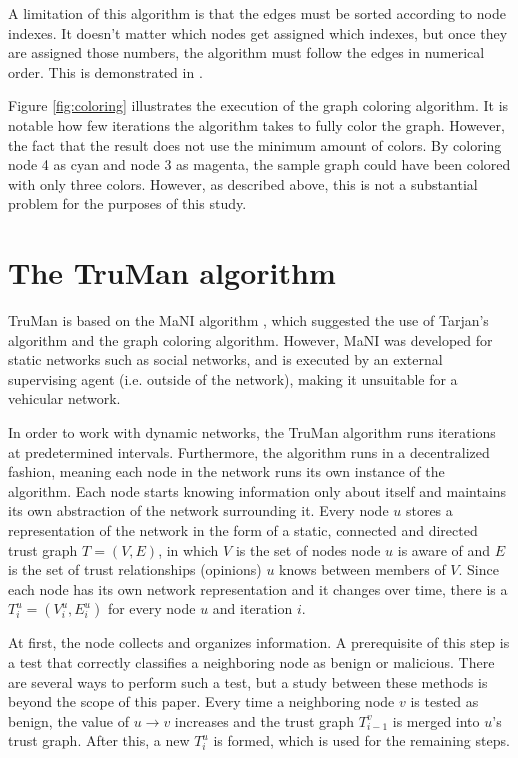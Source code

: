 A limitation of this algorithm is that the edges must be sorted according to node indexes.
It doesn't matter which nodes get assigned which indexes, but once they are assigned those numbers, the algorithm must follow the edges in numerical order.
This is demonstrated in \cite{vernize2013dissertation}.

Figure \autoref{fig:coloring} illustrates the execution of the graph coloring algorithm.
It is notable how few iterations the algorithm takes to fully color the graph.
However, the fact that the result does not use the minimum amount of colors.
By coloring node 4 as cyan and node 3 as magenta, the sample graph could have been colored with only three colors.
However, as described above, this is not a substantial problem for the purposes of this study.

\section{The TruMan algorithm}
\label{section:algorithm}

TruMan is based on the MaNI algorithm \cite{vernize2015malicious}, which suggested the use of Tarjan's algorithm and the graph coloring algorithm.
However, MaNI was developed for static networks such as social networks, and is executed by an external supervising agent (i.e. outside of the network), making it unsuitable for a vehicular network.

In order to work with dynamic networks, the TruMan algorithm runs iterations at predetermined intervals.
Furthermore, the algorithm runs in a decentralized fashion, meaning each node in the network runs its own instance of the algorithm.
Each node starts knowing information only about itself and maintains its own abstraction of the network surrounding it.
Every node $u$ stores a representation of the network in the form of a static, connected and directed trust graph $T = (V, E)$, in which $V$ is the set of nodes node $u$ is aware of and $E$ is the set of trust relationships (opinions) $u$ knows between members of $V$.
Since each node has its own network representation and it changes over time, there is a $T^u_i = (V^u_i, E^u_i)$ for every node $u$ and iteration $i$.

At first, the node collects and organizes information.
A prerequisite of this step is a test that correctly classifies a neighboring node as benign or malicious.
There are several ways to perform such a test, but a study between these methods is beyond the scope of this paper.
Every time a neighboring node $v$ is tested as benign, the value of $u \rightarrow v$ increases and the trust graph $T^v_{i-1}$ is merged into $u$'s trust graph.
After this, a new $T^u_i$ is formed, which is used for the remaining steps.

